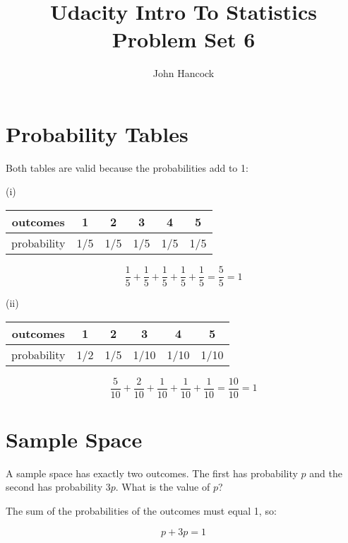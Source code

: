\documentclass[a4paper,11pt]{article}
\author{John Hancock}
\title{Udacity Intro To Statistics Problem Set 6}
\begin{document}
\maketitle
\tableofcontents

\section{Probability Tables}
Both tables are valid because the probabilities add to 1:

(i)

\begin{center}
  \begin{tabular}{ | c | c | c | c  | c | c |}
    \hline
    outcomes & 1 & 2 & 3 & 4 & 5 \\ \hline
    probability & 1/5 & 1/5 & 1/5 & 1/5 & 1/5 \\ \hline
  \end{tabular}
\end{center}


\begin{equation}
  \frac{1}{5} + \frac{1}{5} + \frac{1}{5} + \frac{1}{5} + \frac{1}{5} = 
    \frac{5}{5} = 1
\end{equation}

(ii)

\begin{center}
  \begin{tabular}{ | c | c | c | c  | c | c |}
    \hline
    outcomes & 1 & 2 & 3 & 4 & 5 \\ \hline
    probability & 1/2 & 1/5 & 1/10 & 1/10 & 1/10 \\ \hline
  \end{tabular}
\end{center}

\begin{equation}
  \frac{5}{10} + \frac{2}{10} + \frac{1}{10} + \frac{1}{10} + \frac{1}{10} = 
    \frac{10}{10} = 1
\end{equation}

\section{Sample Space}
A sample space has exactly two outcomes. The first has probability $p$ 
and the second has probability $3p$. What is the value of $p$?

The sum of the probabilities of the outcomes must equal 1, 
so:

\begin{equation}
p + 3p = 1
\end{equation}
\end{document}
